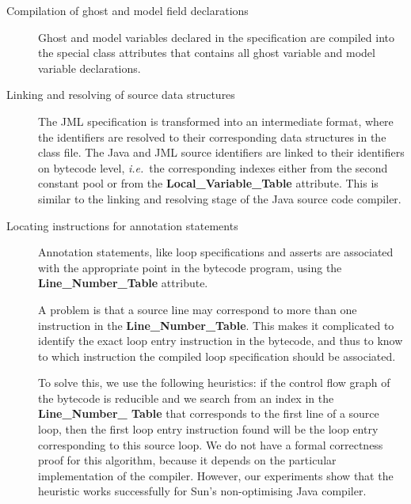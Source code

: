 \begin{description}

\item[Compilation of ghost and model field declarations] 
Ghost and model variables declared in the specification are
compiled into the special class attributes that contains all ghost
variable and model variable declarations. 


\item[Linking and resolving of source data structures]
The JML specification is transformed into an intermediate format,
where the identifiers are resolved to their corresponding data
structures in the class file.  The Java and JML source identifiers are
linked to their identifiers on bytecode level, \emph{i.e.}\ the
corresponding indexes either from the second constant pool or from the
\textbf{Local\_Variable\_Table} attribute. This is similar to the
linking and resolving stage of the Java source code compiler.

\item[Locating instructions for annotation statements] 
Annotation statements, like loop specifications and asserts are
associated with the appropriate point in the bytecode program, using
the \textbf{Line\_Number\_Table} attribute.

A problem is that a source line may correspond to more than
one instruction in the \textbf{Line\_Number\_Table}. This makes it
complicated to identify the exact loop entry instruction in the
bytecode, and thus to know to which instruction the compiled loop
specification should be associated. 
 
To solve this, we use the following heuristics: if the control
flow graph of the bytecode is reducible and we search from an index
in the \textbf{Line\_Number\_ Table} that corresponds to the first line
of a source loop, then the first loop entry instruction found will be
the loop entry corresponding to this source loop.  We do not have a
formal correctness proof for this algorithm, because it depends on the
particular implementation of the compiler.  However, our experiments
show that the heuristic works successfully for Sun's non-optimising
Java compiler.
 

\end{description}
